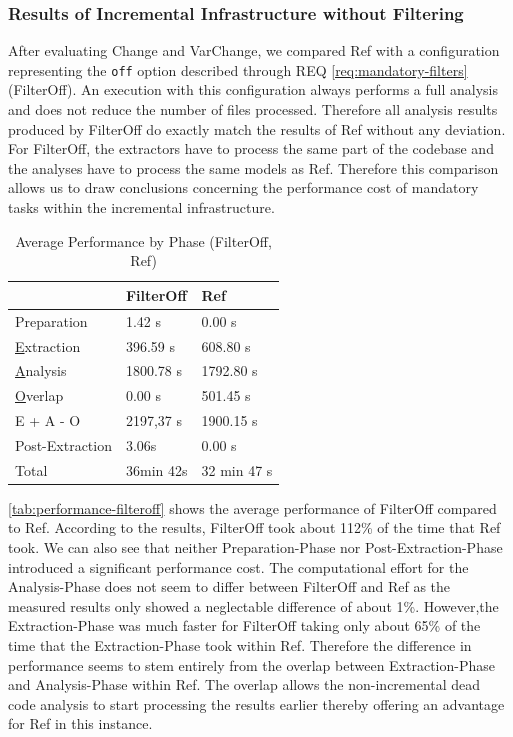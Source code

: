 \documentclass[a4paper]{article}
\begin{document}
 \clearpage
 \newpage
\subsubsection{Results of Incremental Infrastructure without Filtering}\label{evaluation-filteroff}

After evaluating Change and VarChange, we compared Ref with a configuration representing the \texttt{off} option described through REQ \ref{req:mandatory-filters} (FilterOff). An execution with this configuration always performs a full analysis and does not reduce the number of files processed. Therefore all analysis results produced by FilterOff do exactly match the results of Ref without any deviation. For FilterOff, the extractors have to process the same part of the codebase and the analyses have to process the same models as Ref. Therefore this comparison allows us to draw conclusions concerning the performance cost of mandatory tasks within the incremental infrastructure.

\begin {table}[h]
\begin{center}
\caption {Average Performance by Phase (FilterOff, Ref)} \label{tab:performance-filteroff} 
\begin{tabular}{|l | l | l|}
\hline
                               & FilterOff                   & Ref  \\ \hline
	Preparation                & 1.42 s                      & 0.00 s \\
	\underline{E}xtraction     & 396.59 s                    & 608.80 s \\
	\underline{A}nalysis       & 1800.78 s                   & 1792.80 s \\
	\underline{O}verlap        & 0.00 s                      & 501.45 s \\
	E + A - O                  & 2197,37 s                   & 1900.15 s \\
	Post-Extraction            & 3.06s                       & 0.00 s \\ \hline
	Total                      & 36min 42s                   & 32 min 47 s \\ \hline
\end{tabular}
\end{center}
\end{table}

\autoref{tab:performance-filteroff} shows the average performance of FilterOff compared to Ref. According to the results, FilterOff took about 112\% of the time that Ref took. We can also see that neither Preparation-Phase nor Post-Extraction-Phase introduced a significant performance cost. The computational effort for the Analysis-Phase does not seem to differ between FilterOff and Ref as the measured results only showed a neglectable difference of about 1\%. However,the Extraction-Phase was much faster for FilterOff taking only about 65\% of the time that the Extraction-Phase took within Ref. Therefore the difference in performance seems to stem entirely from the overlap between Extraction-Phase and Analysis-Phase within Ref. The overlap allows the non-incremental dead code analysis to start processing the results earlier thereby offering an advantage for Ref in this instance. 
\end{document}
